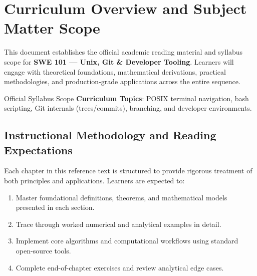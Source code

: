 \section{Curriculum Overview and Subject Matter Scope}

This document establishes the official academic reading material and syllabus scope for \textbf{SWE 101 --- Unix, Git \& Developer Tooling}. Learners will engage with theoretical foundations, mathematical derivations, practical methodologies, and production-grade applications across the entire sequence.

\begin{InsightBox}{Official Syllabus Scope}
  \textbf{Curriculum Topics}: POSIX terminal navigation, bash scripting, Git internals (trees/commits), branching, and developer environments.
\end{InsightBox}

\subsection{Instructional Methodology and Reading Expectations}

Each chapter in this reference text is structured to provide rigorous treatment of both principles and applications. Learners are expected to:
\begin{enumerate}
  \item Master foundational definitions, theorems, and mathematical models presented in each section.
  \item Trace through worked numerical and analytical examples in detail.
  \item Implement core algorithms and computational workflows using standard open-source tools.
  \item Complete end-of-chapter exercises and review analytical edge cases.
\end{enumerate}

